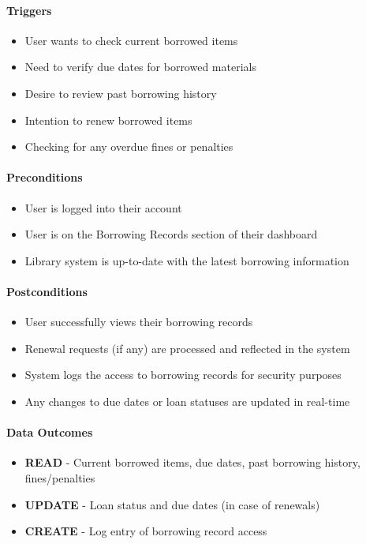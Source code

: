 \paragraph{Triggers}
\begin{itemize}
    \item User wants to check current borrowed items
    \item Need to verify due dates for borrowed materials
    \item Desire to review past borrowing history
    \item Intention to renew borrowed items
    \item Checking for any overdue fines or penalties
\end{itemize}

\paragraph{Preconditions}
\begin{itemize}
    \item User is logged into their account
    \item User is on the Borrowing Records section of their dashboard
    \item Library system is up-to-date with the latest borrowing information
\end{itemize}

\paragraph{Postconditions}
\begin{itemize}
    \item User successfully views their borrowing records
    \item Renewal requests (if any) are processed and reflected in the system
    \item System logs the access to borrowing records for security purposes
    \item Any changes to due dates or loan statuses are updated in real-time
\end{itemize}

\paragraph{Data Outcomes}
\begin{itemize}
    \item \textbf{READ} - Current borrowed items, due dates, past borrowing history, fines/penalties
    \item \textbf{UPDATE} - Loan status and due dates (in case of renewals)
    \item \textbf{CREATE} - Log entry of borrowing record access
\end{itemize}

